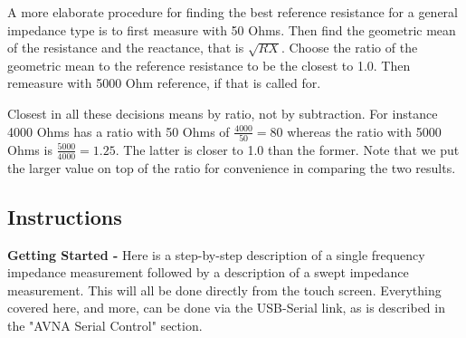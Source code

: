  A more elaborate procedure for finding the best reference resistance for a general impedance type
 is to first measure with 50 Ohms. 
Then find the geometric mean of the resistance and the reactance, that is \(\sqrt{R X}\).  Choose the ratio of the geometric mean to the reference resistance to be the closest to 1.0.
Then remeasure with 5000 Ohm reference, if that is called for.

Closest in all these decisions means by ratio, not by subtraction. For instance 4000 Ohms has a ratio with
50 Ohms of  \( \frac{4000}{50} = 80\) whereas the ratio with 5000 Ohms is \( \frac{5000}{4000} = 1.25\).
The latter is closer to 1.0 than the former.  Note that we put the larger value on
top of the ratio for convenience in comparing the two results.
%
\subsection{Instructions}
\textbf{Getting Started - }Here is a step-by-step description of a single frequency impedance measurement followed by a description of a swept impedance measurement.
This will all be done directly from the touch screen.
Everything covered here, and more, can be done via the USB-Serial link, as is described in the "AVNA Serial Control" section.

